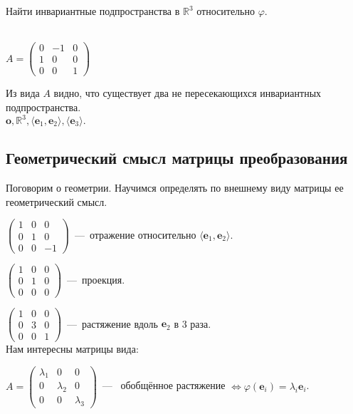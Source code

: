 \begin{prim} %
Найти инвариантные подпространства в $\mathbb{R}^3$ относительно $\varphi$. %
\end{prim}\\

$A = \left( \begin{array}{rr|r} %
0&-1&0\\
1&0&0\\ 
\hline
0&0&1
\end{array} \right)$

Из вида $A$ видно, что существует два не пересекающихся инвариантных подпространства.\\
$\textbf{o}, \mathbb{R}^3, \langle \textbf{e$_1$}, \textbf{e$_2$} \rangle, \langle \textbf{e$_3$} \rangle.$\\ %

\subsection{Геометрический смысл матрицы преобразования}
Поговорим о геометрии. Научимся определять по внешнему виду матрицы ее геометрический смысл.
 
$\left( \begin{array}{rrr}
    1 & 0 & 0  \\
    0 & 1& 0\\
    0&0&-1
\end{array}\right)$~---~отражение относительно $\langle \textbf{e$_1$}, \textbf{e$_2$} \rangle.$ %

$\left( \begin{array}{rrr}
    1 & 0 & 0  \\
    0 & 1& 0\\
    0&0&0
\end{array}\right)$~---~проекция.

$\left( \begin{array}{rrr}
    1 & 0 & 0  \\
    0 & 3& 0\\
    0&0&1
\end{array}\right)$~---~растяжение вдоль $\textbf{e$_2$}$ в 3 раза.\\

Нам интересны матрицы вида:

$A=\left( \begin{array}{ccc} %
    \lambda_1 & 0 & 0  \\
    0 & \lambda_2& 0\\
    0&0&\lambda_3
\end{array}\right)$~---~ обобщённое растяжение $\Leftrightarrow \varphi(\textbf{e$_i$}) = \lambda_i\textbf{e$_i$}$.

